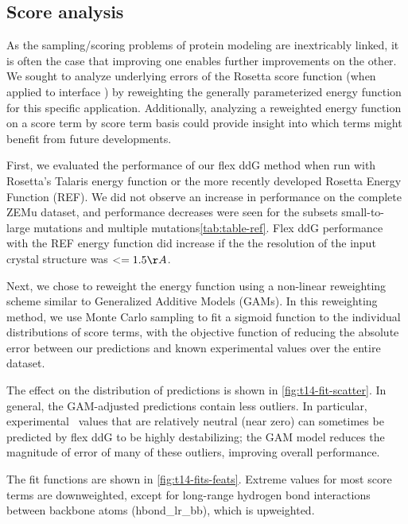 \subsection{Score analysis}

As the sampling/scoring problems of protein modeling are inextricably linked, it is often the case that improving one enables further improvements on the other.
We sought to analyze underlying errors of the Rosetta score function (when applied to interface \ddg) by reweighting the generally parameterized energy function for this specific application.
Additionally, analyzing a reweighted energy function on a score term by score term basis could provide insight into which terms might benefit from future developments.

First, we evaluated the performance of our flex ddG method when run with Rosetta's Talaris\cite{leaver-fay_chapter_2013,song_structure-guided_2011,shapovalov_smoothed_2011} energy function or the more recently developed Rosetta Energy Function (REF)\cite{alford_rosetta_2017}. We did not observe an increase in performance on the complete ZEMu dataset, and performance decreases were seen for the subsets small-to-large mutations and multiple mutations\cref{tab:table-ref}. Flex ddG performance with the REF energy function did increase if the the resolution of the input crystal structure was $<= 1.5 \AA$.

Next, we chose to reweight the energy function using a non-linear reweighting scheme similar to Generalized Additive Models (GAMs)\cite{hastie_generalized_1990}.
In this reweighting method, we use Monte Carlo sampling to fit a sigmoid function to the individual distributions of score terms, with the objective function of reducing the absolute error between our predictions and known experimental values over the entire dataset.

The effect on the distribution of predictions is shown in \cref{fig:t14-fit-scatter}. In general, the GAM-adjusted predictions contain less outliers. In particular, experimental \ddg\ values that are relatively neutral (near zero) can sometimes be predicted by flex ddG to be highly destabilizing; the GAM model reduces the magnitude of error of many of these outliers, improving overall performance.

The fit functions are shown in \cref{fig:t14-fits-feats}. Extreme values for most score terms are downweighted, except for long-range hydrogen bond interactions between backbone atoms (hbond\_lr\_bb), which is upweighted.

